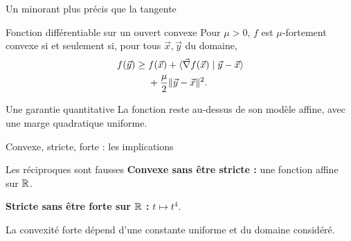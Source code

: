 \begin{frame}[t]{Un minorant plus précis que la tangente}
\coursanalyse
\begin{theoreme}{Fonction différentiable sur un ouvert convexe}
Pour $\mu>0$, $f$ est $\mu$-fortement convexe si et seulement si, pour tous $\vec x,\vec y$ du domaine,
\[\begin{aligned}
f(\vec y)\ge{}&f(\vec x)+\langle \vec\nabla f(\vec x)\mid \vec y-\vec x\rangle\\
&+\frac\mu2\lVert \vec y-\vec x\rVert^2.
\end{aligned}\]
\end{theoreme}
\begin{resultat}{Une garantie quantitative}
La fonction reste au-dessus de son modèle affine, avec une marge quadratique uniforme.
\end{resultat}
\end{frame}

\begin{frame}[t]{Convexe, stricte, forte : les implications}
\coursanalyse
\begin{center}\end{center}
\begin{cours}{Les réciproques sont fausses}
\textbf{Convexe sans être stricte :} une fonction affine sur $\mathbb R$.

\medskip
\textbf{Stricte sans être forte sur $\mathbb R$ :} $t\mapsto t^4$.
\end{cours}
\vfill La convexité forte dépend d'une constante uniforme et du domaine considéré.
\end{frame}

